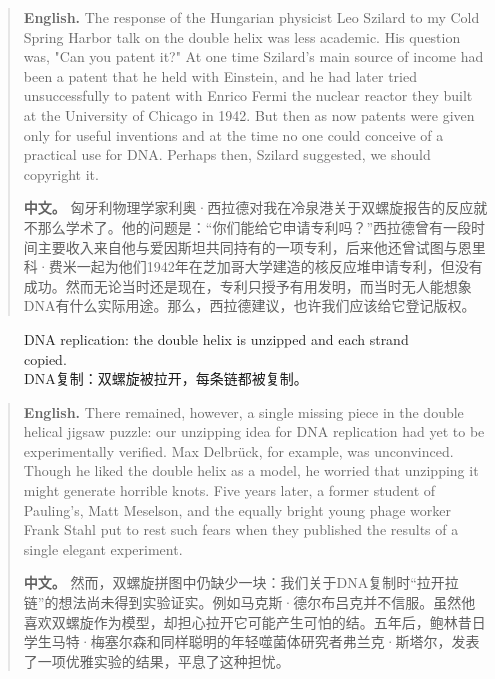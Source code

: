 \begin{quote}
\noindent\textbf{English.} The response of the Hungarian physicist Leo Szilard to my Cold Spring Harbor talk on the double helix was less academic. His question was, "Can you patent it?" At one time Szilard's main source of income had been a patent that he held with Einstein, and he had later tried unsuccessfully to patent with Enrico Fermi the nuclear reactor they built at the University of Chicago in 1942. But then as now patents were given only for useful inventions and at the time no one could conceive of a practical use for DNA. Perhaps then, Szilard suggested, we should copyright it.

\smallskip
\noindent\textbf{中文。} 匈牙利物理学家利奥·西拉德对我在冷泉港关于双螺旋报告的反应就不那么学术了。他的问题是：“你们能给它申请专利吗？”西拉德曾有一段时间主要收入来自他与爱因斯坦共同持有的一项专利，后来他还曾试图与恩里科·费米一起为他们1942年在芝加哥大学建造的核反应堆申请专利，但没有成功。然而无论当时还是现在，专利只授予有用发明，而当时无人能想象DNA有什么实际用途。那么，西拉德建议，也许我们应该给它登记版权。
\end{quote}

\begin{figure}[htbp]
\centering
{}
\caption{DNA replication: the double helix is unzipped and each strand copied.\\DNA复制：双螺旋被拉开，每条链都被复制。}
\end{figure}

\begin{quote}
\noindent\textbf{English.} There remained, however, a single missing piece in the double helical jigsaw puzzle: our unzipping idea for DNA replication had yet to be experimentally verified. Max Delbrück, for example, was unconvinced. Though he liked the double helix as a model, he worried that unzipping it might generate horrible knots. Five years later, a former student of Pauling's, Matt Meselson, and the equally bright young phage worker Frank Stahl put to rest such fears when they published the results of a single elegant experiment.

\smallskip
\noindent\textbf{中文。} 然而，双螺旋拼图中仍缺少一块：我们关于DNA复制时“拉开拉链”的想法尚未得到实验证实。例如马克斯·德尔布吕克并不信服。虽然他喜欢双螺旋作为模型，却担心拉开它可能产生可怕的结。五年后，鲍林昔日学生马特·梅塞尔森和同样聪明的年轻噬菌体研究者弗兰克·斯塔尔，发表了一项优雅实验的结果，平息了这种担忧。
\end{quote}

